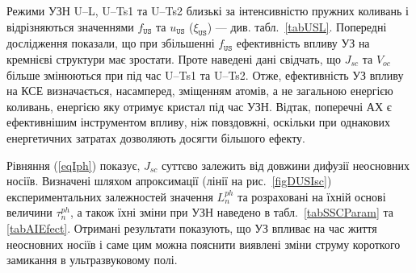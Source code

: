 Режими УЗН U--L, U--Ts1 та U--Ts2 близькі за інтенсивністю пружних коливань і відрізняються значеннями
$f_\mathtt{US}$ та $u_\mathtt{US}$ ($\xi_\mathtt{US}$) --- див. табл.~\ref{tabUSL}.
Попередні дослідження показали, що при збільшенні $f_\mathtt{US}$ ефективність впливу УЗ
на кремнієві структури має зростати.
Проте наведені дані свідчать, що $J_{sc}$ та $V_{oc}$ більше змінюються при під час U--Ts1 та U--Ts2.
Отже,
ефективність УЗ впливу на КСЕ визначається, насамперед, зміщенням атомів,
а не загальною енергією коливань, енергією яку отримує кристал під час УЗН.
Відтак, поперечні АХ є ефективнішим інструментом впливу, ніж повздовжні,
оскільки при однакових енергетичних затратах дозволяють досягти більшого ефекту.



Рівняння (\ref{eqIph}) показує, $J_{sc}$ суттєво залежить від довжини дифузії неосновних носіїв.
Визначені шляхом апроксимації (лінії на рис.~\ref{figDUSIsc})
експериментальних залежностей значення $L_n^{ph}$ та розраховані на їхній основі величини $\tau_n^{ph}$,
а також їхні зміни при УЗН наведено в табл.~\ref{tabSSCParam} та \ref{tabAIEfect}.
Отримані результати показують, що УЗ впливає на час життя неосновних носіїв і саме цим можна пояснити виявлені зміни струму короткого замикання в ультразвуковому полі.


